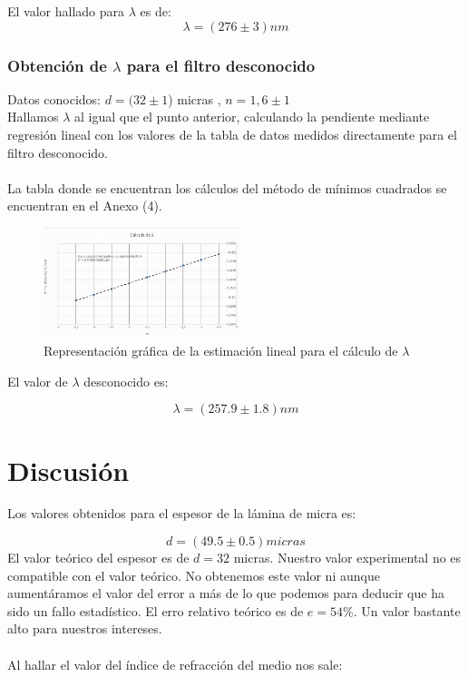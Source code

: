\documentclass[11pt,letterpaper,twocolumn]{article}
\begin{document}



El valor hallado para $\lambda$ es de:
\begin{equation}
	\boxed{\lambda=\left( 276 \pm 3  \right) nm}
\end{equation}
\subsubsection{Obtención de $\lambda$ para el filtro desconocido}
Datos conocidos: $d=(32\pm 1$) micras , $n=1,6 \pm 1$ \\
Hallamos $\lambda$ al igual que el punto anterior, calculando la pendiente mediante regresión lineal con los valores de la tabla de datos medidos directamente para el filtro desconocido.\\
\\
La tabla donde se encuentran los cálculos del método de mínimos cuadrados se encuentran en el Anexo (4).

\begin{figure}[H]
	\centering
	\includegraphics[width=0.51\textwidth]{imagen/grafical2.png}
	\caption{Representación gráfica de la estimación lineal para el cálculo de $\lambda$}
\end{figure}

El valor de $\lambda$ desconocido es:

\begin{equation}
	\boxed{\lambda=\left( 257.9 \pm 1.8 \right) nm}
\end{equation}
\section{Discusión}%
\label{sec:i}
 Los valores obtenidos para el espesor de la lámina de micra es:

\begin{equation}
	\boxed{d=(49.5 \pm 0.5) micras}
\end{equation}
El valor teórico del espesor es de $d=32$ micras. Nuestro valor experimental no es compatible con el valor teórico. No obtenemos este valor ni aunque aumentáramos el valor del error a más de lo que podemos para deducir que ha sido un fallo estadístico. El erro relativo teórico es de $e=54\%$. Un valor bastante alto para nuestros intereses.\\
\\
Al hallar el valor del índice de refracción del medio nos sale:
\end{document}
